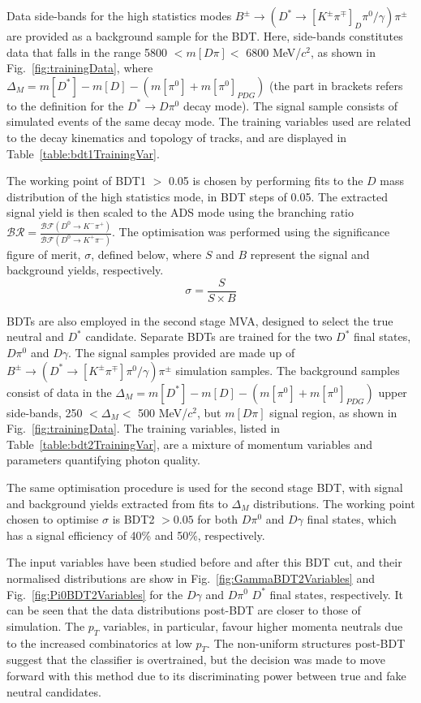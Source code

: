 \documentclass[oneside,12pt]{article}
\begin{document}
Data side-bands for the high statistics modes $B^{\pm}\rightarrow(D^{*}
\rightarrow [K^{\pm}\pi^{\mp}]_{D} \pi^0 /\gamma)\pi^{\pm}$ are provided as a
background sample for the BDT. Here, side-bands constitutes data that falls in
the range 5800 $ < m[D\pi] <$ 6800 MeV/$c^2$, as shown in
Fig.~\ref{fig:trainingData}, where $\Delta_M=m[D^{*}] - m[D]- (m[\pi^0] +
m[\pi^0]_{PDG})$ (the part in brackets refers to the definition for the
$D^*\rightarrow D\pi^0$ decay mode). The signal sample consists of simulated
events of the same decay mode. The training variables used are related to the
decay kinematics and topology of tracks, and are displayed in
Table~\ref{table:bdt1TrainingVar}. 

The working point of BDT1 $>$ 0.05 is chosen by performing fits to the $D$ mass
distribution of the high statistics mode, in BDT steps of 0.05. The extracted
signal yield is then scaled to the ADS mode using the branching ratio
$\mathcal{BR} = \frac{\mathcal{BF}(D^0 \rightarrow K^- \pi^+)}{\mathcal{BF}(D^0
\rightarrow K^+ \pi^-)}$. The optimisation was performed using the significance
figure of merit, $\sigma$, defined below, where $S$ and $B$ represent the signal
and background yields, respectively.
\begin{equation}
\sigma = \frac{S}{S \times B}
\label{D_branching_ratio}
\end{equation}

BDTs are also employed in the second stage MVA, designed to select the true
neutral and $D^*$ candidate. Separate BDTs are trained for the two $D^*$ final
states, $D\pi^0$ and $D\gamma$. The signal samples provided are made up of
$B^{\pm}\rightarrow (D^*\rightarrow [K^{\pm}\pi^{\mp}]\pi^0/\gamma)\pi^{\pm}$
simulation samples. The background samples consist of data in the
$\Delta_M=m[D^{*}] - m[D]- (m[\pi^0] + m[\pi^0]_{PDG})$ upper side-bands, 250 $
< \Delta_{M} < $ 500 MeV/$c^2$, but $m[D\pi]$ signal region, as shown in
Fig.~\ref{fig:trainingData}. The training variables, listed in
Table~\ref{table:bdt2TrainingVar}, are a mixture of momentum variables and
parameters quantifying photon quality. 

The same optimisation procedure is used for the second stage BDT, with signal
and background yields extracted from fits to $\Delta_M$ distributions. The
working point chosen to optimise $\sigma$ is BDT2 $>0.05$ for both $D\pi^0$ and
$D\gamma$ final states, which has a signal efficiency of 40\% and 50\%,
respectively.

The input variables have been studied before and after this BDT cut, and their
normalised distributions are show in Fig.~\ref{fig:GammaBDT2Variables} and
Fig.~\ref{fig:Pi0BDT2Variables} for the $D\gamma$ and $D\pi^0$ $D^*$ final
states, respectively. It can be seen that the data distributions post-BDT are
closer to those of simulation.  The $p_T$ variables, in particular, favour
higher momenta neutrals due to the increased combinatorics at low $p_T$. The
non-uniform structures post-BDT suggest that the classifier is overtrained, but
the decision was made to move forward with this method due to its discriminating
power between true and fake neutral candidates.
\end{document}
